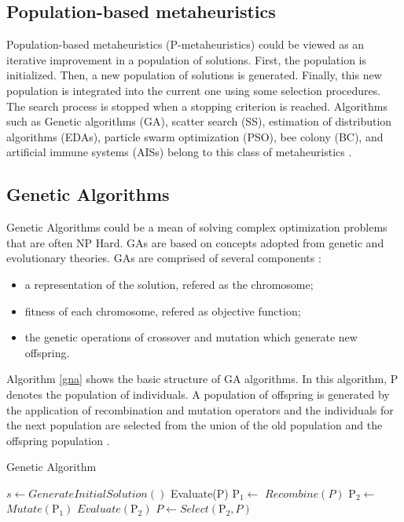 \documentclass{bmcart}
\begin{document}
\subsection{Population-based metaheuristics}

Population-based metaheuristics (P-metaheuristics) could be viewed as an iterative improvement in a population of solutions. First, the population is initialized. Then, a new population of solutions is generated. Finally, this new population is integrated into the current one using some selection procedures. The search process is stopped when a stopping criterion is reached. Algorithms such as Genetic algorithms (GA), scatter search (SS), estimation of distribution algorithms (EDAs), particle swarm optimization (PSO), bee colony (BC), and artificial immune systems (AISs) belong to this class of metaheuristics \citep{talbi2009metaheuristics}. 

\subsection{Genetic Algorithms}

Genetic Algorithms could be a mean of solving complex optimization problems that are often NP Hard. GAs are based on concepts adopted from genetic and evolutionary theories. GAs are comprised of several components \citep{hong2000simultaneously} \citep{shousha2003performance} :

\begin{itemize}
\item a representation of the solution, refered as the chromosome;
\item fitness of each chromosome, refered as objective function;
\item the genetic operations of crossover and mutation which generate new offspring. 
\end{itemize}


Algorithm \ref{gna} shows the basic structure of GA algorithms. In this algorithm, P denotes the population of individuals. A population of offspring is generated by the application of recombination and mutation operators and the individuals for the next population are selected from the union of the old population and the offspring population \citep{raidl2010metaheuristic}.


\begin{algorithm}[h]
  \caption{Genetic Algorithm}\label{gna}
  \begin{algorithmic}[3]
    
    \State $s\gets GenerateInitialSolution()$
    \State Evaluate(P)
    \State $\mbox{P}_1\gets$ $Recombine(P)$
    \State $\mbox{P}_2\gets$ $Mutate(\mbox{P}_1)$ 
    \State $Evaluate(\mbox{P}_2)$
    \State $P\gets Select(\mbox{P}_2,P)$
    \EndWhile
      
  \end{algorithmic}
\end{algorithm}
\end{document}
